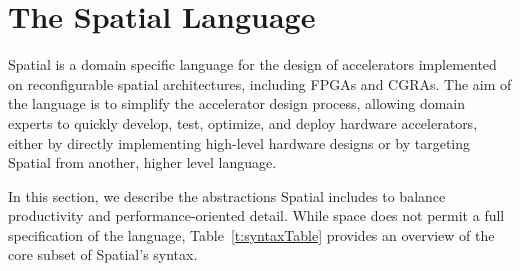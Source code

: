 \section{The Spatial Language}
\label{language}

Spatial is a domain specific language for the design of accelerators implemented on reconfigurable spatial architectures, including FPGAs and CGRAs.
The aim of the language is to simplify the accelerator design process,
allowing domain experts to quickly develop, test, optimize, and deploy hardware accelerators, either by
directly implementing high-level hardware designs or by targeting Spatial from another, higher level language.

In this section, we describe the abstractions Spatial includes to balance productivity and performance-oriented detail.
While space does not permit a full specification of the language, Table~\ref{t:syntaxTable} provides an overview of the core subset of Spatial's syntax.












